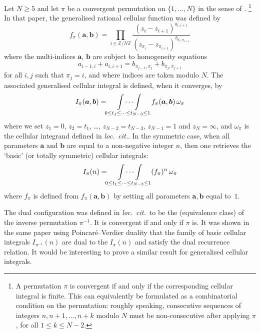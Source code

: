 \documentclass[12pt,reqno]{amsart}
\theoremstyle{remark}
\newcommand\ba{\boldsymbol a}
\newcommand\bb{\boldsymbol b}
\newcommand\Z{\mathbb Z}
\begin{document}
 Let $N\geq 5$ and let $\pi$ be a convergent permutation on $\{1,\dots,N\}$ in the sense of \cite{Br16}.%
\footnote{A permutation $\pi$ is convergent if and only if the corresponding cellular integral is finite. This can equivalently be formulated as a combinatorial condition on the permutation: roughly speaking,  consecutive sequences of integers $n,n+1,\ldots, n+k$ modulo $N$ must be  non-consecutive after applying $\pi$, for all  $1\leq k\leq N-2$.} 
In that paper,  the generalised  rational  cellular function was defined by
\begin{equation*}
f_{\pi}(\ba,\bb) = \prod_{i\in \Z/N\Z} \frac{ (z_i - z_{i+1})^{a_{i,i+1}}}{ (z_{\pi_i} - z_{\pi_{i+1}})^{b_{\pi_i,\pi_{i+1}}}}
\end{equation*}
where the multi-indices $\ba$, $\bb$ are subject to homogeneity equations 
\[ a_{i-1,i}  + a_{i,i+1} = b_{\pi_{j-1}, \pi_{j}} + b_{\pi_{j}, \pi_{j+1}}\]
for all $i,j$ such that  $\pi_j = i$, and where indices are taken modulo $N$. The associated generalised cellular integral is defined, when it converges,  by
\begin{equation} \label{GenI}
I_{\pi}(\ba,\bb)= \idotsint\limits_{0\leq t_1 \leq \dots\leq t_{N-3}\leq 1}   f_{\pi}(\ba,\bb)\,  \omega_{\pi} \end{equation}
where we set $z_1=0$, $z_2=t_1$, \dots, $z_{N-2} = t_{N-3}$, $z_{N-1} = 1$ and $z_N=\infty$, and $\omega_{\pi}$ is the cellular integrand defined in \emph{loc.\ cit.}.  In the symmetric case, when all parameters $\ba$ and $\bb$ are equal to a non-negative integer $n$, then  one retrieves the `basic'  (or totally symmetric) cellular integrals:
\[ I_{\pi}(n) = \idotsint\limits_{0\leq t_1 \leq \dots\leq t_{N-3}\leq 1} (f_{\pi})^n \,  \omega_{\pi} \]
where  $f_{\pi}$ is defined from $f_{\pi}(\ba,\bb)$ by setting all  parameters $\ba,\bb$ equal to~$1$.


The dual configuration was defined in \emph{loc.\ cit.}\  to be the (equivalence class) of the inverse permutation 
  $\pi^{-1}$. It is  convergent if and only if $\pi$ is.    It was shown in the same paper using  Poincar\'e--Verdier duality that the family of basic cellular integrals $I_{\pi^{-1}}(n)$ are dual to the $I_{\pi}(n)$ and satisfy the dual recurrence relation. 
  It would be  interesting to prove a similar result for   generalised cellular integrals.
\end{document}
